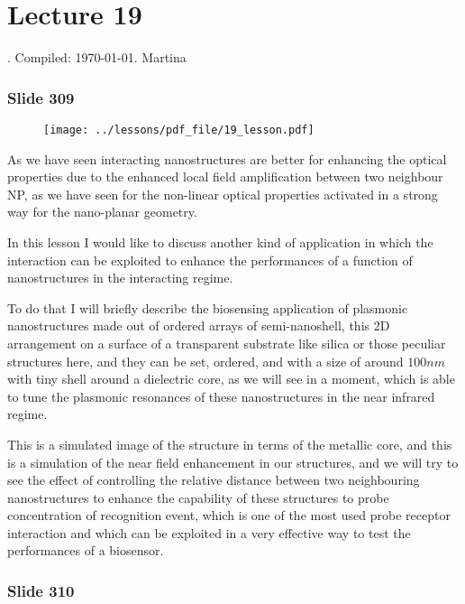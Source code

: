 \documentclass[../main/main.tex]{subfiles}
\begin{document}
\section{Lecture 19}
 . Compiled:  \today. Martina 
 
 
\subsubsection{Slide 309}

\begin{figure}[h!]
\centering
\texttt{[image: ../lessons/pdf\_file/19\_lesson.pdf]}
\end{figure}

As we have seen interacting nanostructures are better for enhancing the optical properties due to the enhanced local field amplification between two neighbour NP, as we have seen for the non-linear optical properties activated in a strong way for the nano-planar geometry.

In this lesson I would like to discuss another kind of application in which the interaction can be exploited to enhance the performances of a function of nanostructures in the interacting regime.

To do that I will briefly describe the biosensing application of plasmonic nanostructures made out of ordered arrays of semi-nanoshell, this 2D arrangement on a surface of a transparent substrate like silica or those peculiar structures here, and they can be set, ordered, and with a size of around $100 nm$ with tiny shell around a dielectric core, as we will see in a moment, which is able to tune the plasmonic resonances of these nanostructures in the near infrared regime.

This is a simulated image of the structure in terms of the metallic core, and this is a simulation of the near field enhancement in our structures, and we will try to see the effect of controlling the relative distance  between two neighbouring nanostructures to enhance the capability of these structures to probe concentration of recognition event, which is one of the most used probe receptor interaction and which can be exploited in a very effective way to test the performances of a biosensor.

\newpage

\subsubsection{Slide 310}
\end{document}
